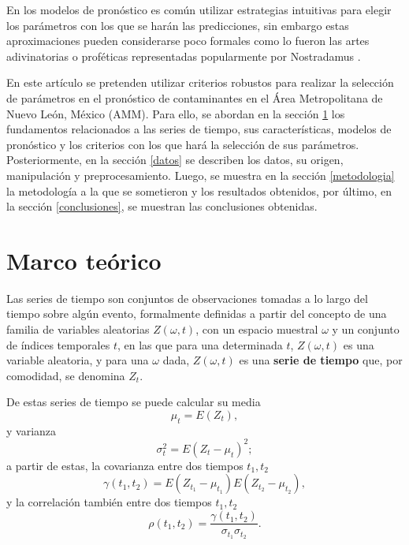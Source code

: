 \documentclass{elsarticle}
\begin{document}
En los modelos de pronóstico es común utilizar estrategias intuitivas para elegir los parámetros con los que se harán las predicciones, sin embargo estas aproximaciones pueden considerarse poco formales como lo fueron las artes adivinatorias o proféticas representadas popularmente por Nostradamus \cite{Popkin1984}. 

En este artículo se pretenden utilizar criterios robustos para realizar la selección de parámetros en el pronóstico de contaminantes en el Área Metropolitana de Nuevo León, México (AMM). Para ello, se abordan en la sección \ref{mt} los fundamentos relacionados a las series de tiempo, sus características, modelos de pronóstico y los criterios con los que hará la selección de sus parámetros. Posteriormente, en la sección \ref{datos} se describen los datos, su origen, manipulación y preprocesamiento. Luego, se muestra en la sección \ref{metodologia} la metodología a la que se sometieron y los resultados obtenidos, por último, en la sección \ref{conclusiones}, se muestran las conclusiones obtenidas.

\section{Marco teórico}
\label{mt}

Las series de tiempo son conjuntos de observaciones tomadas a lo largo del tiempo sobre algún evento, formalmente definidas \cite{Wei2019} a partir del concepto de una familia de variables aleatorias $Z(\omega, t)$, con un espacio muestral $\omega$ y un conjunto de índices temporales $t$, en las que para una determinada $t$, $Z(\omega, t)$ es una variable aleatoria, y para una $\omega$ dada, $Z(\omega, t)$ es una \textbf{serie de tiempo} que, por comodidad, se denomina $Z_t$.

De estas series de tiempo se puede calcular su media
\begin{equation}
\mu_t = E(Z_t),
\end{equation}
y varianza 
\begin{equation}
\sigma^2_t = E(Z_t - \mu_t)^2;
\end{equation}
a partir de estas, la covarianza entre dos tiempos $t_1, t_2$
\begin{equation}
\gamma(t_1, t_2) = E(Z_{t_{1}} - \mu_{t_{1}}) E(Z_{t_{2}} - \mu_{t_{2}}),
\end{equation}
y la correlación también entre dos tiempos $t_1, t_2$
\begin{equation}
    \rho (t_1, t_2) = \frac{\gamma (t_1, t_2)}{\sigma_{t_{1}} \sigma_{t_{2}}}.
\end{equation}
\end{document}
